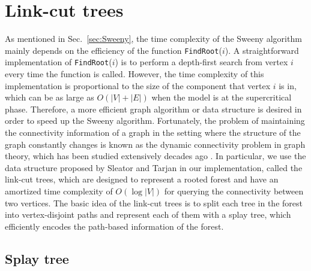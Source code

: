 \section{Link-cut trees}\label{sec:linkcut}
As mentioned in Sec.~\ref{sec:Sweeny}, the time complexity of the Sweeny algorithm mainly depends on the efficiency
of the function \texttt{FindRoot}($i$). A straightforward implementation of \texttt{FindRoot}($i$) is to 
perform a depth-first search from vertex $i$ every time the function is called. However, the time complexity
of this implementation is  proportional to the size of the component that vertex $i$ is in, 
which can be as large as $O(|V| + |E|)$ when the model is at the supercritical phase. Therefore, a more efficient
graph algorithm or data structure is desired in order to speed up the Sweeny algorithm.
Fortunately, the problem of maintaining the connectivity information of a graph in the setting where the structure of the graph constantly changes
is known as the dynamic connectivity problem in graph theory, which has been studied extensively decades ago \cite{Sleator1983,Henzinger1999,Thorup2000,Holm2001,Sleator1985}.
In particular, we use the data structure proposed by Sleator and Tarjan in our implementation\cite{Sleator1983}, called the link-cut trees, which are designed to represent a rooted
forest and have an amortized time complexity of $O(\log |V|)$ for querying the connectivity between two vertices. The
basic idea of the link-cut trees is to split each tree in the forest into vertex-disjoint paths and 
represent each of them with a splay tree\cite{Sleator1985}, which efficiently encodes the path-based information of the forest.

\subsection{Splay tree}

